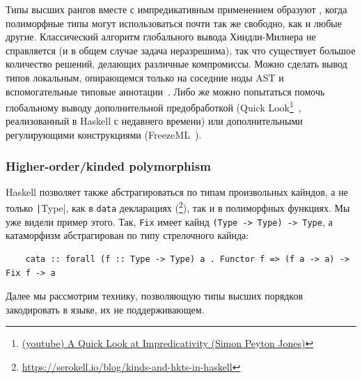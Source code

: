 Типы высших рангов вместе с импредикативным применением образуют , когда полиморфные типы могут использоваться почти так же свободно, как и любые другие.
Классический алгоритм глобального вывода Хиндли-Милнера не справляется (и в общем случае задача неразрешима), так что существует большое количество решений, делающих различные компромиссы.
Можно сделать вывод типов локальным, опирающемся только на соседние ноды AST и вспомогательные типовые аннотации~\cite{pierce2000local, christiansen2013bidirectional, dunfield2019sound}.
Либо же можно попытаться помочь глобальному выводу дополнительной предобработкой (Quick Look\footnote{\href{https://youtu.be/ZuNMo136QqI?si=qp8PAEeeF-bioCB_}{(youtube) A Quick Look at Impredicativity (Simon Peyton Jones)}}~\cite{serrano2020quick}, реализованный в Haskell с недавнего времени) или дополнительными регулирующими конструкциями (FreezeML~\cite{emrich2020freezeml}).


\subsubsection{Higher-order/kinded polymorphism}

Haskell позволяет также абстрагироваться по типам произвольных кайндов, а не только \texttt|Type|, как в \texttt{data} декларациях (\footnote{\url{https://serokell.io/blog/kinds-and-hkts-in-haskell}}), так и в полиморфных функциях.
Мы уже видели пример этого.
Так, \texttt{Fix} имеет кайнд \texttt{(Type -> Type) -> Type}, а катаморфизм абстрагирован по типу стрелочного кайнда:
\begin{verbatim}
    cata :: forall (f :: Type -> Type) a . Functor f => (f a -> a) -> Fix f -> a
\end{verbatim}

Далее мы рассмотрим технику, позволяющую типы высших порядков закодировать в языке, их не поддерживающем. %



